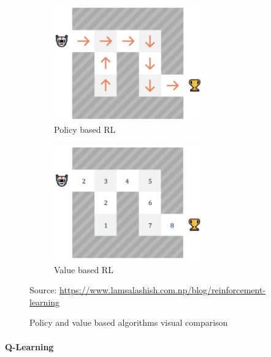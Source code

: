 \documentclass[12pt,a4paper,openright,twoside]{book}
\newcommand{\fonte}[1]{{\color{gray} \small \hypersetup{citecolor=gray} Source: #1}}
\begin{document}
\begin{figure}[t]
    \begin{subfigure}[b]{0.49\textwidth}
        \centering
        \includegraphics[width=0.7\textwidth]{figures/policy-based-rl.png}
        \caption{Policy based RL}
        \label{fig:policy-based-rl}
    \end{subfigure}
    \begin{subfigure}[b]{0.49\textwidth}
        \centering
        \includegraphics[width=0.7\textwidth]{figures/value-based-rl.png}
        \caption{Value based RL}
        \label{fig:value-based-rl}
    \end{subfigure}
\caption{Policy and value based algorithms visual comparison}%
\fonte{\url{https://www.lamsalashish.com.np/blog/reinforcement-learning}}
\label{fig:rl-methods}
\end{figure}

\paragraph{Q-Learning}
\end{document}
